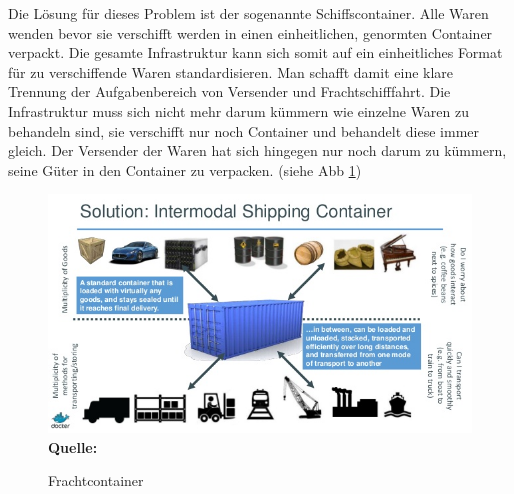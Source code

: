 Die Lösung für dieses Problem ist der sogenannte Schiffscontainer. Alle Waren wenden bevor sie verschifft werden in einen einheitlichen, genormten Container verpackt. Die gesamte Infrastruktur kann sich somit auf ein einheitliches Format für zu verschiffende Waren standardisieren. Man schafft damit eine klare Trennung der Aufgabenbereich von Versender und Frachtschifffahrt. Die Infrastruktur muss sich nicht mehr darum kümmern wie einzelne Waren zu behandeln sind, sie verschifft nur noch Container und behandelt diese immer gleich. Der Versender der Waren hat sich hingegen nur noch darum zu kümmern, seine Güter in den Container zu verpacken. (siehe Abb \ref{fig:shipping_container})
\begin{figure}[htbp]
  \centering  
  \includegraphics[scale=0.7]{img/shipping_container.jpg}\\
  \footnotesize\sffamily\textbf{Quelle:} \cite{hykes_docker_2013}
  \caption{Frachtcontainer}
  \label{fig:shipping_container}
\end{figure}

